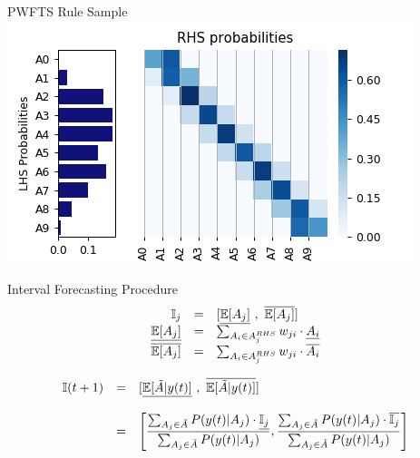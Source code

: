 \documentclass{beamer}
\begin{document}
\begin{frame}{PWFTS Rule Sample}
\includegraphics[width=\textwidth]{figures/pwfts_rules_firstorder.png}
\end{frame}

\begin{frame}{Interval Forecasting Procedure}
$$
\begin{array}{rcl}
\intvl_j & = & \displaystyle [\underline{\mathbb{E}[ \ufset ]}\ ,\ \overline{\mathbb{E}[ \ufset ]}] \\
\underline{\mathbb{E}[ \ufset ]} & = & \sum_{A_i \in \ufset^{RHS}} w_{ji}\cdot \underline{A_i} \\ 
\overline{\mathbb{E}[ \ufset ]} & = & \sum_{A_i \in \ufset^{RHS}} w_{ji}\cdot \overline{A_i}
\end{array}
$$

$$
\begin{array}{rcl}
\mathbb{I}(t+1) & = & \displaystyle [\underline{\mathbb{E}[ \tilde{A} | y(t) ]}\ ,\ \overline{\mathbb{E}[ \tilde{A} | y(t) ]}] \\
& & \\
& = & \displaystyle \left[\frac{\sum_{A_j \in \tilde{A}} P(y(t)|A_j)\cdot \underline{\mathbb{I}_j}}{\sum_{A_j \in \tilde{A}} P(y(t)|A_j)},\frac{\sum_{A_j \in \tilde{A}} P(y(t)|A_j)\cdot \overline{\mathbb{I}_j}}{\sum_{A_j \in \tilde{A}} P(y(t)|A_j)}\right]
\end{array}
$$
\end{frame}

\end{document}
